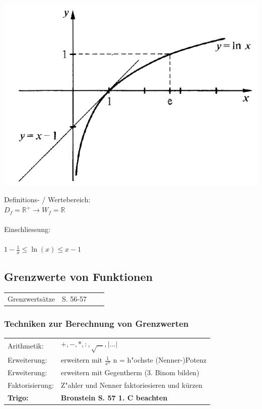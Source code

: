 			\begin{minipage}{.45\linewidth}
			\includegraphics[width=0.95\linewidth]{Bilder/ln-funktion}
			\end{minipage}
			\hfill
			\begin{minipage}{.5\linewidth}
			Definitions- / Wertebereich: \\
			$D_f = \mathbb{R^+} \rightarrow W_f = \mathbb{R}$ \\
			\\
			Einschliessung: \\
			\\
			$1-\frac{1}{x} \leq \ln(x) \leq x-1$
			\end{minipage}
				
			
			
			
		\subsection{Grenzwerte von Funktionen}
			\begin{tabular}{llll}
			Grenzwertsätze & S. 56-57 & & \\
			\end{tabular}
			
			\subsubsection{Techniken zur Berechnung von Grenzwerten}	
			\begin{tabular}{ll}
			Arithmetik: & $+, -, *, :, \sqrt{...}, \vert ...\vert$ \\
			Erweiterung:& erweitern mit $\frac{1}{x^n}$ n = h"ochste (Nenner-)Potenz \\
			Erweiterung: & erweitern mit Gegentherm (3. Binom bilden)\\
			Faktorisierung: & Z"ahler und Nenner faktoriesieren und kürzen \\
			\textbf{Trigo:} & \textbf{Bronstein S. 57 1. C beachten}
			\end{tabular}
			
